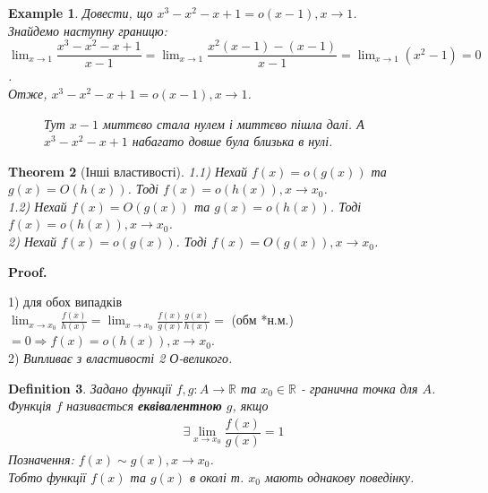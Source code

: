 \documentclass[a4paper, 14pt]{article}
\makeatletter
\def\qed{$\blacksquare$}
\theoremstyle{theoremdd}
\newtheorem{theorem}{Theorem}[subsection]
\theoremstyle{theoremdd}
\newtheorem{definition}[theorem]{Definition}
\theoremstyle{theoremdd}
\theoremstyle{theoremdd}
\newtheorem{example}[theorem]{Example}
\theoremstyle{theoremdd}
\theoremstyle{theoremdd}
\theoremstyle{theoremdd}
\theoremstyle{theoremdd}
\renewenvironment{proof}[1][Proof.\\]{\par
\pushQED{\hfill \qed}%
\normalfont \topsep6\p@\@plus6\p@\relax
\trivlist
\item\relax
{\bfseries
#1\@addpunct{.}}\hspace\labelsep\ignorespaces
}{%
\popQED\endtrivlist\@endpefalse
}
\makeatother
\begin{document}
\begin{example}
Довести, що $x^3 - x^2 - x + 1 = o(x-1), x \to 1$.\\
Знайдемо наступну границю:\\
$\displaystyle \lim_{x \to 1} \dfrac{x^3-x^2-x+1}{x-1} = \lim_{x \to 1} \dfrac{x^2(x-1)-(x-1)}{x-1} = \lim_{x \to 1} (x^2-1) = 0$.\\
Отже, $x^3 - x^2 - x + 1 = o(x-1), x \to 1$.
\begin{figure} [H]
\centering
{
\caption*{Тут $x-1$ миттєво стала нулем і миттєво пішла далі. А $x^3-x^2-x+1$ набагато довше була близька в нулі.}
}
\end{figure}
\end{example}

\begin{theorem}[Інші властивості]
1.1) Нехай $f(x) = o(g(x))$ та $g(x) = O(h(x))$. Тоді $f(x) = o(h(x)), x \to x_0$.\\
1.2) Нехай $f(x) = O(g(x))$ та $g(x) = o(h(x))$. Тоді $f(x) = o(h(x)), x \to x_0$.
\bigskip \\
2) Нехай $f(x) = o(g(x))$. Тоді $f(x) = O(g(x)), x \to x_0$.
\end{theorem}

\begin{proof}
1) для обох випадків\\
$\displaystyle \lim_{x \to x_0} \frac{f(x)}{h(x)} = \lim_{x \to x_0} \frac{f(x)}{g(x)} \frac{g(x)}{h(x)} =$ (обм *н.м.) $= 0 \Rightarrow f(x) = o(h(x)), x \to x_0$.
\bigskip \\
2) \textit{Випливає з властивості 2 О-великого.}
\end{proof}

\begin{definition}
Задано функції $f,g: A \to \mathbb{R}$ та $x_0 \in \mathbb{R}$ - гранична точка для $A$.\\
Функція $f$ називається \textbf{еквівалентною} $g$, якщо
\begin{align*}
\exists \displaystyle\lim_{x \to x_0} \dfrac{f(x)}{g(x)} = 1
\end{align*}
Позначення: $f(x) \sim g(x), x \to x_0$.\\
Тобто функції $f(x)$ та $g(x)$ в околі т. $x_0$ мають однакову поведінку.
\end{definition}
\end{document}
